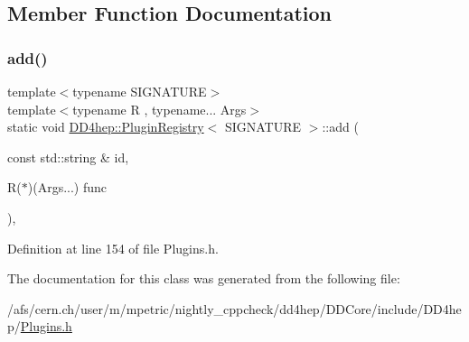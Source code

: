\subsection{Member Function Documentation}
\hypertarget{class_d_d4hep_1_1_plugin_registry_a6602c60ef4e8ca3fe83709233ca91367}{}\label{class_d_d4hep_1_1_plugin_registry_a6602c60ef4e8ca3fe83709233ca91367} 
\subsubsection{\texorpdfstring{add()}{add()}}
{\footnotesize\ttfamily template$<$typename S\+I\+G\+N\+A\+T\+U\+RE$>$ \\
template$<$typename R , typename... Args$>$ \\
static void \hyperlink{class_d_d4hep_1_1_plugin_registry}{D\+D4hep\+::\+Plugin\+Registry}$<$ S\+I\+G\+N\+A\+T\+U\+RE $>$\+::add (\begin{DoxyParamCaption}\item[{const std\+::string \&}]{id,  }\item[{R($\ast$)(Args...)}]{func }\end{DoxyParamCaption})\hspace{0.3cm}{\ttfamily [inline]}, {\ttfamily [static]}}



Definition at line 154 of file Plugins.\+h.



The documentation for this class was generated from the following file\+:\begin{DoxyCompactItemize}
\item 
/afs/cern.\+ch/user/m/mpetric/nightly\+\_\+cppcheck/dd4hep/\+D\+D\+Core/include/\+D\+D4hep/\hyperlink{_plugins_8h}{Plugins.\+h}\end{DoxyCompactItemize}
